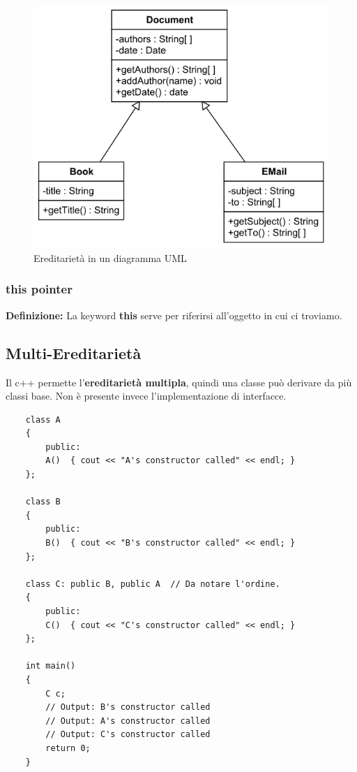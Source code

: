 \begin{figure}[ht]
	\centering
	\includegraphics[width=1\textwidth, height=1\textheight, keepaspectratio]{./imgs/inheritance_class_uml2.jpg}
	\caption{Ereditarietà in un diagramma UML}
	\label{fig:ereditarietà}
\end{figure}

\subsubsection{this pointer}

\textsf{\small \textbf{Definizione: } La keyword \textbf{this} serve per riferirsi all'oggetto in cui ci troviamo.} \\ %

\subsection{Multi-Ereditarietà}


\textsf{\small Il c++ permette l'\textbf{ereditarietà multipla}, quindi una classe può derivare da più classi base. Non è presente invece l'implementazione di interfacce.} \\

\begin{lstlisting}
	class A
	{
		public:
		A()  { cout << "A's constructor called" << endl; }
	};
	
	class B
	{
		public:
		B()  { cout << "B's constructor called" << endl; }
	};
	
	class C: public B, public A  // Da notare l'ordine.
	{
		public:
		C()  { cout << "C's constructor called" << endl; }
	};
	
	int main()
	{
		C c;
		// Output: B's constructor called
		// Output: A's constructor called
		// Output: C's constructor called
		return 0;
	}
\end{lstlisting}

